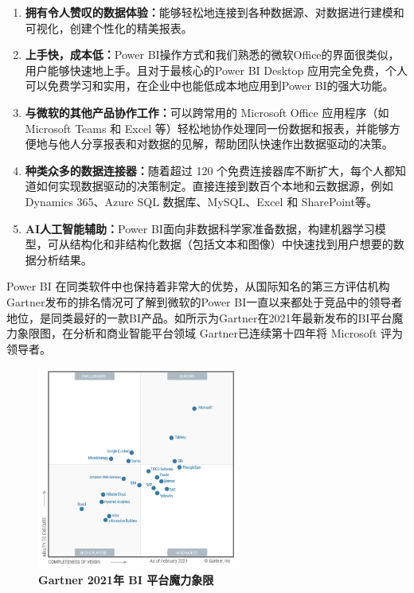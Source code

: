 \begin{enumerate}
    \item \textbf{拥有令人赞叹的数据体验：}能够轻松地连接到各种数据源、对数据进行建模和可视化，创建个性化的精美报表。
    \item \textbf{上手快，成本低：}Power BI操作方式和我们熟悉的微软Office的界面很类似，用户能够快速地上手。且对于最核心的Power BI Desktop 应用完全免费，个人可以免费学习和实用，在企业中也能低成本地应用到Power BI的强大功能。
    \item \textbf{与微软的其他产品协作工作：}可以跨常用的 Microsoft Office 应用程序（如 Microsoft Teams 和 Excel 等）轻松地协作处理同一份数据和报表，并能够方便地与他人分享报表和对数据的见解，帮助团队快速作出数据驱动的决策。
    \item \textbf{种类众多的数据连接器：}随着超过 120 个免费连接器库不断扩大，每个人都知道如何实现数据驱动的决策制定。直接连接到数百个本地和云数据源，例如 Dynamics 365、Azure SQL 数据库、MySQL、Excel 和 SharePoint等。
    \item \textbf{AI人工智能辅助：}Power BI面向非数据科学家准备数据，构建机器学习模型，可从结构化和非结构化数据（包括文本和图像）中快速找到用户想要的数据分析结果。
\end{enumerate}

Power BI 在同类软件中也保持着非常大的优势，从国际知名的第三方评估机构Gartner发布的排名情况可了解到微软的Power BI一直以来都处于竞品中的领导者地位，是同类最好的一款BI产品。如所示为Gartner在2021年最新发布的BI平台魔力象限图，在分析和商业智能平台领域 Gartner已连续第十四年将 Microsoft 评为领导者。

\begin{figure}[htbp]
    \centering
    \includegraphics[width=0.6\textwidth]{figure/PowerBI/gartner_bi_rank.png}
    \caption{\textbf{Gartner 2021年 BI 平台魔力象限}}
    \label{fig:gartner_bi_rank}
\end{figure}
